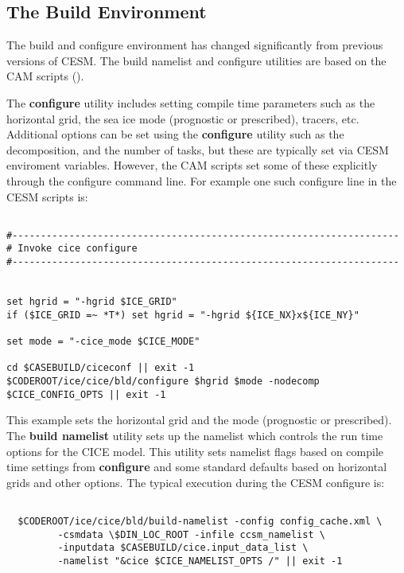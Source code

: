 
\subsection{The Build Environment}

The build and configure environment has changed significantly from previous
versions of CESM. The build namelist and configure utilities are based on
the CAM scripts (). 

The \textbf{configure} utility includes setting compile
time parameters such as the horizontal grid, the sea ice mode (prognostic or
prescribed), tracers, etc. Additional options 
can be set using the \textbf{configure} utility such as the decomposition,
and the number of tasks, but these are typically set via CESM enviroment
variables. However, the CAM scripts set some of these explicitly through
the configure command line. For example one such configure line in the
CESM scripts is:

\begin{verbatim}

#--------------------------------------------------------------------
# Invoke cice configure
#--------------------------------------------------------------------


set hgrid = "-hgrid $ICE_GRID"
if ($ICE_GRID =~ *T*) set hgrid = "-hgrid ${ICE_NX}x${ICE_NY}"

set mode = "-cice_mode $CICE_MODE"

cd $CASEBUILD/ciceconf || exit -1
$CODEROOT/ice/cice/bld/configure $hgrid $mode -nodecomp $CICE_CONFIG_OPTS || exit -1

\end{verbatim}

This example sets the horizontal grid and the mode (prognostic or prescribed).  The \textbf{build namelist} utility sets up the namelist which controls the
run time options for the CICE model. This utility sets namelist flags based
on compile time settings from \textbf{configure} and some standard defaults
based on horizontal grids and other options. The typical execution during
the CESM configure is:

\begin{verbatim}

  $CODEROOT/ice/cice/bld/build-namelist -config config_cache.xml \
         -csmdata \$DIN_LOC_ROOT -infile ccsm_namelist \
         -inputdata $CASEBUILD/cice.input_data_list \
         -namelist "&cice $CICE_NAMELIST_OPTS /" || exit -1

\end{verbatim}

